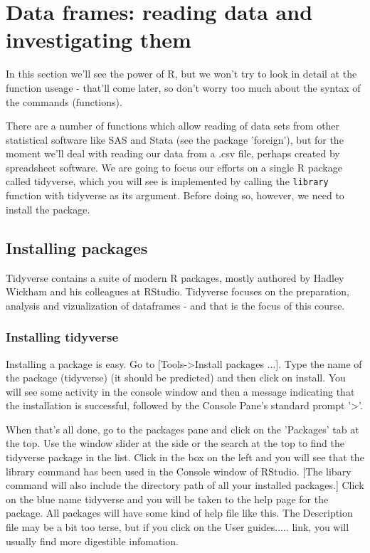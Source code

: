 \documentclass[titlepage]{book}
\begin{document}
\section{Data frames: reading data and investigating them}

In this section we'll see the power of R, but we won't try to look in detail at the function useage - that'll come later, so don't worry too much about the syntax of the commands (functions).

There are a number of functions which allow reading of data sets from other statistical software like SAS and Stata (see the package 'foreign'), but for the moment we'll deal with reading our data from a .csv file, perhaps created by spreadsheet software. We are going to focus our efforts on a single R package called tidyverse, which you will see is implemented by calling the \texttt{library} function with tidyverse as its argument.  Before doing so, however, we need to install the package.

\subsection{Installing packages} 

Tidyverse contains a suite of modern R packages, mostly authored by Hadley Wickham and his colleagues at RStudio. Tidyverse focuses on the preparation, analysis and vizualization of dataframes - and that is the focus of this course.  

\subsubsection{Installing tidyverse}
Installing a package is easy. Go to [Tools->Install packages ...]. Type the name of the package (tidyverse) (it should be predicted) and then click on install. You will see some activity in the console window and then a message indicating that the installation is successful, followed by the Console Pane's standard prompt '>'.

When that's all done, go to the packages pane and click on the 'Packages' tab at the top. Use the window slider at the side or the search at the top to find the tidyverse package in the list. Click in the box on the left and you will see that the library command has been used in the Console window of RStudio. [The libary command will also include the directory path of all your installed packages.] Click on the blue name tidyverse and you will be taken to the help page for the package. All packages will have some kind of help file like this. The Description file may be a bit too terse, but if you click on the User guides..... link, you will usually find more digestible infomation.
\end{document}
